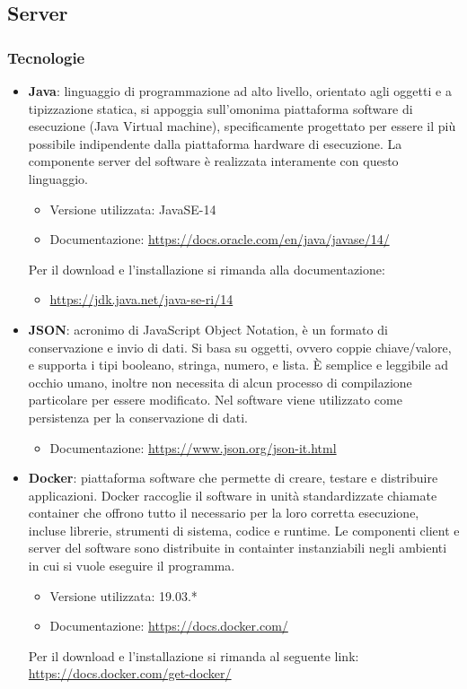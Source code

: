 \subsection{Server}

\subsubsection{Tecnologie}
\label{tecnologie}

\begin{itemize}
	\item \textbf{Java}: linguaggio di programmazione ad alto livello, orientato agli oggetti e a tipizzazione statica, si appoggia sull'omonima piattaforma software di esecuzione (Java Virtual machine), specificamente progettato per essere il più possibile indipendente dalla piattaforma hardware di esecuzione. La componente server del software è realizzata interamente con questo linguaggio.
	\begin{itemize}
		\item Versione utilizzata: JavaSE-14
		\item Documentazione: \url{https://docs.oracle.com/en/java/javase/14/}
	\end{itemize}
	Per il download e l'installazione si rimanda alla documentazione:
	\begin{itemize}
		\item \url{https://jdk.java.net/java-se-ri/14}
	\end{itemize}

	\item \textbf{JSON}: acronimo di JavaScript Object Notation, è un formato di conservazione e invio di dati. Si basa su oggetti, ovvero coppie chiave/valore, e supporta i tipi booleano, stringa, numero, e lista. È semplice e leggibile ad occhio umano, inoltre non necessita di alcun processo di
	compilazione particolare per essere modificato. Nel software viene utilizzato come persistenza per la conservazione di dati.
	\begin{itemize}
		\item Documentazione: \url{https://www.json.org/json-it.html}
	\end{itemize}

	\item \textbf{Docker}: piattaforma software che permette di creare, testare e distribuire applicazioni. Docker raccoglie il software in unità standardizzate chiamate container che offrono tutto il necessario per la loro corretta esecuzione, incluse librerie, strumenti di sistema, codice e runtime. Le componenti client e server del software sono distribuite in containter instanziabili negli ambienti in cui si vuole eseguire il programma.
	\begin{itemize}
		\item Versione utilizzata: 19.03.*
		\item Documentazione: \url{https://docs.docker.com/}
	\end{itemize}
	Per il download e l'installazione si rimanda al seguente link: \url{https://docs.docker.com/get-docker/}
	

\end{itemize}
